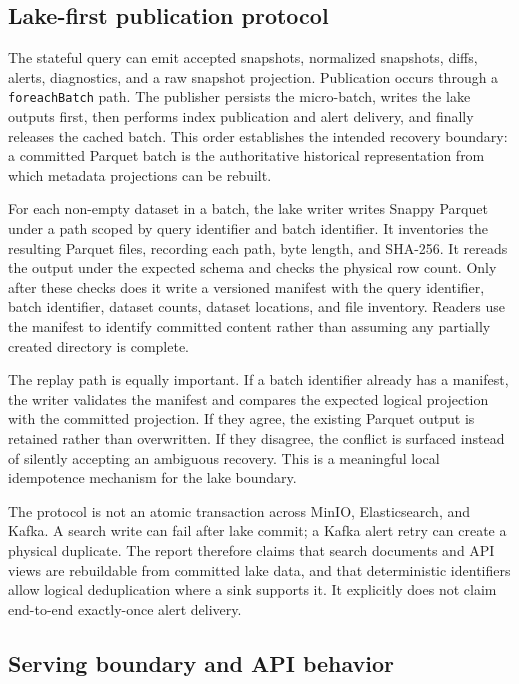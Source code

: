 \subsection{Lake-first publication protocol}

The stateful query can emit accepted snapshots, normalized snapshots, diffs, alerts, diagnostics, and a raw snapshot projection. Publication occurs through a \texttt{foreachBatch} path. The publisher persists the micro-batch, writes the lake outputs first, then performs index publication and alert delivery, and finally releases the cached batch. This order establishes the intended recovery boundary: a committed Parquet batch is the authoritative historical representation from which metadata projections can be rebuilt.

For each non-empty dataset in a batch, the lake writer writes Snappy Parquet under a path scoped by query identifier and batch identifier. It inventories the resulting Parquet files, recording each path, byte length, and SHA-256. It rereads the output under the expected schema and checks the physical row count. Only after these checks does it write a versioned manifest with the query identifier, batch identifier, dataset counts, dataset locations, and file inventory. Readers use the manifest to identify committed content rather than assuming any partially created directory is complete.

The replay path is equally important. If a batch identifier already has a manifest, the writer validates the manifest and compares the expected logical projection with the committed projection. If they agree, the existing Parquet output is retained rather than overwritten. If they disagree, the conflict is surfaced instead of silently accepting an ambiguous recovery. This is a meaningful local idempotence mechanism for the lake boundary.

The protocol is not an atomic transaction across MinIO, Elasticsearch, and Kafka. A search write can fail after lake commit; a Kafka alert retry can create a physical duplicate. The report therefore claims that search documents and API views are rebuildable from committed lake data, and that deterministic identifiers allow logical deduplication where a sink supports it. It explicitly does not claim end-to-end exactly-once alert delivery.

\subsection{Serving boundary and API behavior}

